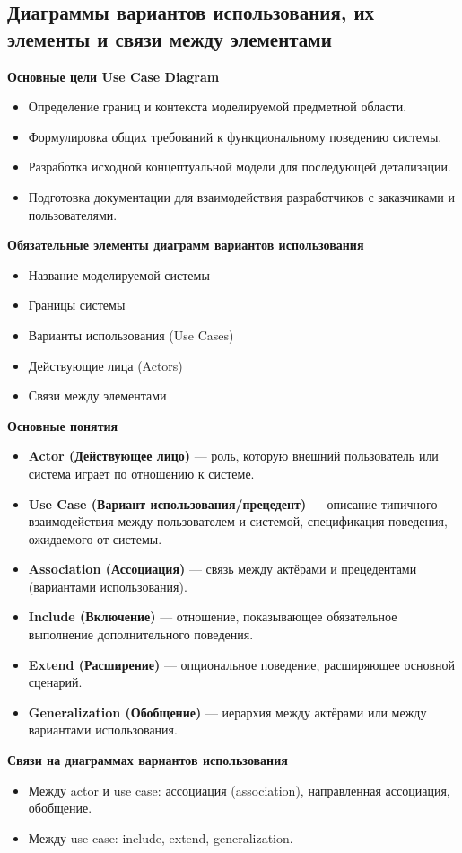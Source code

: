 \documentclass[a4paper, 12pt]{report}
\numberwithin{equation}{section}
\begin{document}
\subsection*{Диаграммы вариантов использования, их элементы и связи между элементами}
\textbf{Основные цели Use Case Diagram}
\begin{itemize}
    \item Определение границ и контекста моделируемой предметной области.
    \item Формулировка общих требований к функциональному поведению системы.
    \item Разработка исходной концептуальной модели для последующей детализации.
    \item Подготовка документации для взаимодействия разработчиков с заказчиками и пользователями.
\end{itemize}
\textbf{Обязательные элементы диаграмм вариантов использования}
\begin{itemize}
    \item Название моделируемой системы
    \item Границы системы
    \item Варианты использования (Use Cases)
    \item Действующие лица (Actors)
    \item Связи между элементами
\end{itemize}
\textbf{Основные понятия}
\begin{itemize}
    \item \textbf{Actor (Действующее лицо)} — роль, которую внешний пользователь или система играет по отношению к системе.
    \item \textbf{Use Case (Вариант использования/прецедент)} — описание типичного взаимодействия между пользователем и системой, спецификация поведения, ожидаемого от системы.
    \item \textbf{Association (Ассоциация)} — связь между актёрами и прецедентами (вариантами использования).
    \item \textbf{Include (Включение)} — отношение, показывающее обязательное выполнение дополнительного поведения.
    \item \textbf{Extend (Расширение)} — опциональное поведение, расширяющее основной сценарий.
    \item \textbf{Generalization (Обобщение)} — иерархия между актёрами или между вариантами использования.
\end{itemize}
\textbf{Связи на диаграммах вариантов использования}
\begin{itemize}
    \item Между actor и use case: ассоциация (association), направленная ассоциация, обобщение.
    \item Между use case: include, extend, generalization.
\end{itemize}
\end{document}
